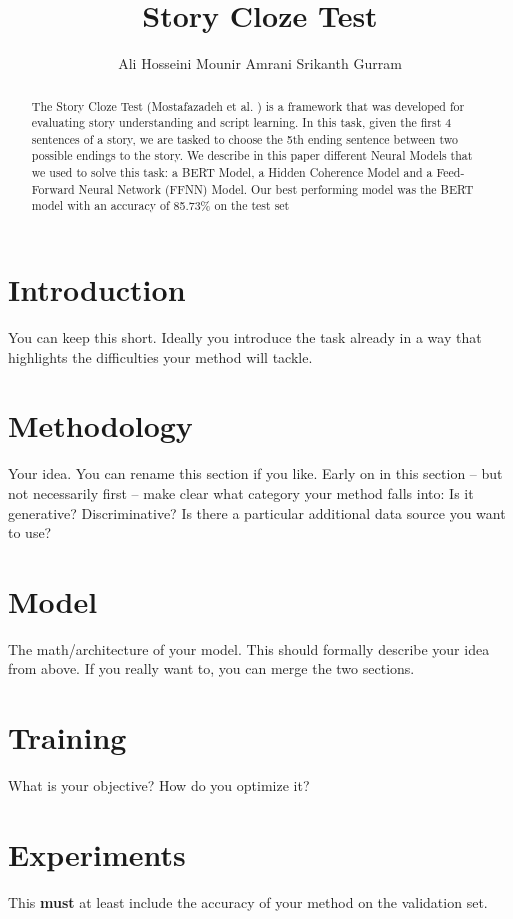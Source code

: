 \documentclass{article}
\title{Story Cloze Test}
\author{Ali Hosseini \qquad Mounir Amrani \qquad Srikanth Gurram}
\begin{document}

\maketitle

\begin{abstract}
The Story Cloze Test (Mostafazadeh et al. \cite{cloze}) is a framework that was developed for evaluating story understanding and script learning. In this task, given the first 4 sentences of a story, we are tasked to choose the 5th ending sentence between two possible endings to the story.
We describe in this paper different Neural Models that we used to solve this task: a BERT Model, a Hidden Coherence Model and a Feed-Forward Neural Network (FFNN) Model. Our best performing model was the BERT model with an accuracy of 85.73\% on the test set
\end{abstract}

\section{Introduction}

You can keep this short. Ideally you introduce the task already in a way that highlights the difficulties  your method will tackle.
\section{Methodology}
Your idea. You can rename this section if you like. Early on in this section -- but not necessarily first -- make clear what category your method falls into: Is it generative? Discriminative? Is there a particular additional data source you want to use?
\section{Model}
The math/architecture of your model. This should formally describe your idea from above. If you really want to, you can merge the two sections.
\section{Training}
What is your objective? How do you optimize it?

\section{Experiments}
This {\bf must} at least include the accuracy of your method on the validation set.
\end{document}
